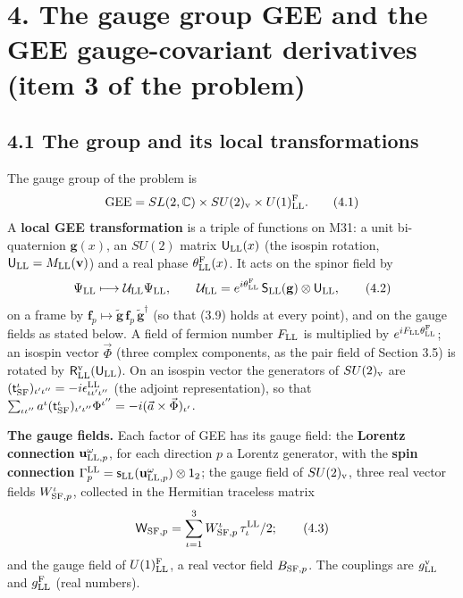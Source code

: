 \documentclass[
  10pt,
]{article}
\begin{document}
\hypertarget{the-gauge-group-gee-and-the-gee-gauge-covariant-derivatives-item-3-of-the-problem}{%
\section{4. The gauge group GEE and the GEE gauge-covariant derivatives
(item 3 of the
problem)}\label{the-gauge-group-gee-and-the-gee-gauge-covariant-derivatives-item-3-of-the-problem}}

\hypertarget{the-group-and-its-local-transformations}{%
\subsection{4.1 The group and its local
transformations}\label{the-group-and-its-local-transformations}}

The gauge group of the problem is
\[\mathrm{GEE}=SL(2,\mathbb C)\times SU(2)_{\rm v}\times U(1)^{\rm F}_{\rm LL}.\tag{4.1}\]
A \textbf{local GEE transformation} is a triple of functions on M31: a
unit bi-quaternion \(\mathbf g(x)\), an \(SU(2)\) matrix
\(\mathsf U_{\rm LL}(x)\) (the isospin rotation,
\(\mathsf U_{\rm LL}=M_{\rm LL}(\mathbf v)\)) and a real phase
\(\theta^{\rm F}_{\rm LL}(x)\). It acts on the spinor field by
\[\Psi_{\rm LL}\longmapsto\mathcal U_{\rm LL}\Psi_{\rm LL},\qquad\mathcal U_{\rm LL}=e^{i\theta^{\rm F}_{\rm LL}}\,\mathsf S_{\rm LL}(\mathbf g)\otimes\mathsf U_{\rm LL},\tag{4.2}\]
on a frame by
\(\mathbf f_p\mapsto\tilde{\mathbf g}\,\mathbf f_p\,\tilde{\mathbf g}^\dagger\)
(so that (3.9) holds at every point), and on the gauge fields as stated
below. A field of fermion number \(F_{\rm LL}\) is multiplied by
\(e^{iF_{\rm LL}\theta^{\rm F}_{\rm LL}}\); an isospin vector
\(\vec\Phi\) (three complex components, as the pair field of Section
3.5) is rotated by \(\mathsf R^{\rm v}_{\rm LL}(\mathsf U_{\rm LL})\).
On an isospin vector the generators of \(SU(2)_{\rm v}\) are
\((\mathsf t^\iota_{\rm SF})_{\iota'\iota''}=-i\epsilon^{\rm LL}_{\iota\iota'\iota''}\)
(the adjoint representation), so that
\(\sum_{\iota\iota''}a^\iota(\mathsf t^\iota_{\rm SF})_{\iota'\iota''}\Phi^{\iota''}=-i(\vec a\times\vec\Phi)_{\iota'}\).

\textbf{The gauge fields.} Each factor of GEE has its gauge field: the
\textbf{Lorentz connection} \(\mathbf u^\omega_{{\rm LL},p}\), for each
direction \(p\) a Lorentz generator, with the \textbf{spin connection}
\(\Gamma^{\rm LL}_p=\mathsf s_{\rm LL}(\mathbf u^\omega_{{\rm LL},p})\otimes\mathsf 1_2\);
the gauge field of \(SU(2)_{\rm v}\), three real vector fields
\(W^\iota_{{\rm SF},p}\), collected in the Hermitian traceless matrix
\[\mathsf W_{{\rm SF},p}=\sum_{\iota=1}^3W^\iota_{{\rm SF},p}\,\tau^{\rm LL}_\iota/2;\tag{4.3}\]
and the gauge field of \(U(1)^{\rm F}_{\rm LL}\), a real vector field
\(B_{{\rm SF},p}\). The couplings are \(g^{\rm v}_{\rm LL}\) and
\(g^{\rm F}_{\rm LL}\) (real numbers).
\end{document}
